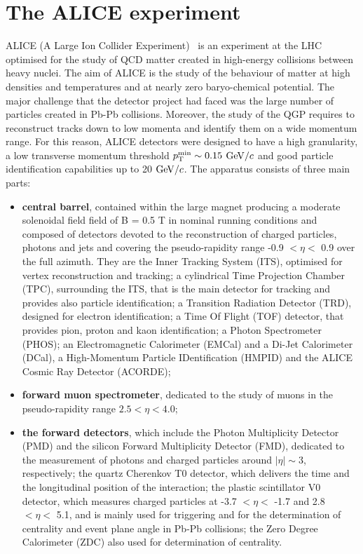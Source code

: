 \section{The ALICE experiment}
\label{sec:ALICE}
ALICE (A Large Ion Collider Experiment)~\cite{Abelev:2014ffa} is an experiment 
at the LHC optimised for the study of QCD matter
created in high-energy collisions between heavy nuclei.
The aim of ALICE is the study of the behaviour of matter at high densities and temperatures 
and at nearly zero baryo-chemical potential. 
The major challenge that the detector project had faced was the large number of 
particles created in Pb-Pb collisions. Moreover, the study of the QGP requires to reconstruct tracks down to
low momenta and identify them on a wide momentum range.
For this reason, ALICE detectors were designed to have a 
high granularity, a low transverse momentum threshold $p_{\rm T}^{\rm min} \sim 0.15 $ 
$\mathrm{GeV}/c$ and good particle identification capabilities up to 20 $\mathrm{GeV}/c$.
The apparatus consists of three main parts: 
\begin{itemize}
\item \textbf{central barrel}, contained within the large magnet producing a moderate solenoidal field
field of B = 0.5 T in nominal running conditions and composed of detectors devoted to the reconstruction of charged particles, photons
and jets and covering the pseudo-rapidity range -0.9 $< \eta <$ 0.9 over the 
full azimuth. They are the Inner Tracking System (ITS), optimised for vertex 
reconstruction and tracking; a cylindrical Time Projection Chamber (TPC),
 surrounding the ITS, that is the main detector for tracking and provides also particle identification; a 
 Transition Radiation Detector (TRD), designed for electron identification; 
 a Time Of Flight (TOF) detector, that provides pion, proton and kaon 
 identification; a Photon Spectrometer (PHOS); an Electromagnetic 
 Calorimeter (EMCal) and a Di-Jet Calorimeter (DCal), a High-Momentum Particle IDentification (HMPID) 
 and the ALICE Cosmic Ray Detector (ACORDE);
\item \textbf{forward muon spectrometer}, dedicated to the study of 
muons in the pseudo-rapidity range $2.5< \eta < 4.0$;
\item \textbf{the forward detectors}, which include the Photon Multiplicity Detector 
(PMD) and the silicon Forward Multiplicity Detector (FMD), dedicated to the 
measurement of photons and charged particles around $|\eta| \sim 3$, respectively; 
the quartz Cherenkov T0 detector, which delivers the time and the longitudinal
 position of the interaction; the plastic scintillator V0 detector, which measures 
 charged particles at -3.7 $< \eta <$ -1.7 and 2.8 $< \eta <$ 5.1, and is mainly used
  for triggering and for the determination of centrality and event plane angle in 
  Pb-Pb collisions; the Zero Degree Calorimeter (ZDC) also used for determination of centrality.
\end{itemize}
